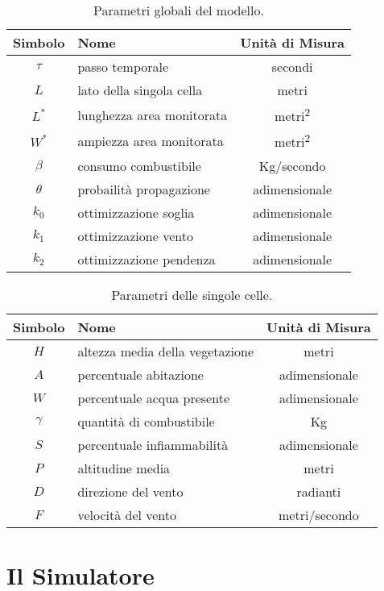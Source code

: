 \documentclass[draft]{article}
\newcommand{\combvar}{Kg}
\begin{document}
\begin{table}
\centering
\begin{tabular}{|c|l|c|}
	\hline
	\textbf{Simbolo} & \textbf{Nome} & \textbf{Unità di Misura}\\
	\hline
	$\tau$ & passo temporale & secondi\\
	$L$ & lato della singola cella & metri\\
	$L^*$ & lunghezza area monitorata & metri\textsuperscript{2}\\
	$W^*$ & ampiezza area monitorata & metri\textsuperscript{2}\\
	$\beta$ & consumo combustibile & \combvar/secondo\\
	$\theta$ & probailità propagazione & adimensionale\\
	$k_0$ & ottimizzazione soglia & adimensionale\\
	$k_1$ & ottimizzazione vento & adimensionale\\
	$k_2$ & ottimizzazione pendenza & adimensionale\\
	\hline
\end{tabular}
\caption{Parametri globali del modello.}
\label{tab:globals}
\end{table}

\begin{table}
\centering
\begin{tabular}{|c|l|c|}
	\hline
	\textbf{Simbolo} & \textbf{Nome} & \textbf{Unità di Misura}\\
	\hline
	$H$ & altezza media della vegetazione & metri\\
	$A$ & percentuale abitazione & adimensionale\\
	$W$ & percentuale acqua presente & adimensionale\\
	$\gamma$ & quantità di combustibile & \combvar\\
	$S$ & percentuale infiammabilità & adimensionale\\
	$P$ & altitudine media & metri\\
	$D$ & direzione del vento & radianti\\
	$F$ & velocità del vento & metri/secondo\\
	\hline
\end{tabular}
\caption{Parametri delle singole celle.}
\label{tab:params}
\end{table}

\section{Il Simulatore}
\end{document}
